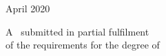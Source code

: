 \begin{titlepage}

{\large April 2020}\\[1.4cm] %
\vspace{2cm}
 
 A \typeofthesis\ submitted in partial fulfilment\\of the requirements for the degree of\\
\degree

\vfill %

\end{titlepage}